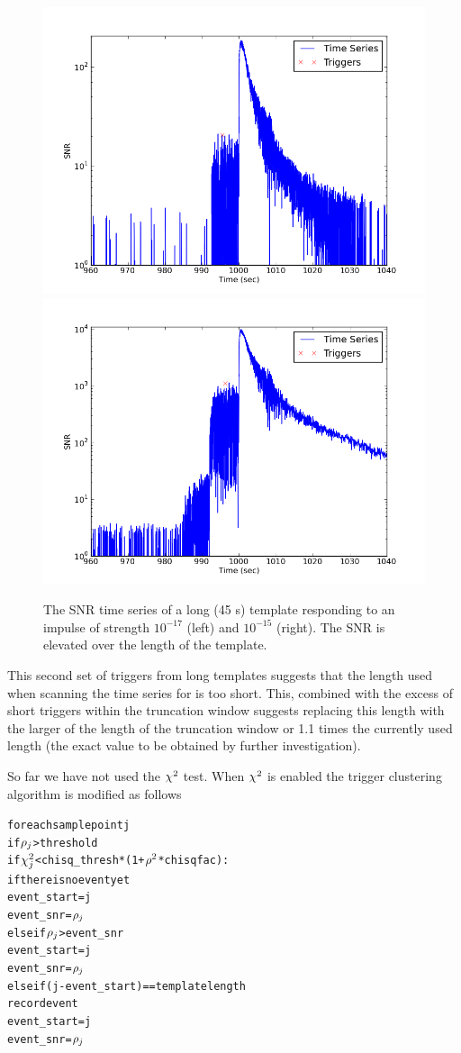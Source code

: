 \begin{figure}
  \includegraphics[width=0.5\linewidth]{figures/detchar/snrs_17_long}
  \includegraphics[width=0.5\linewidth]{figures/detchar/snrs_15_long}
  \caption[SNR time series of a long template and loud impulse] {
  \label{f:long_snr_series}
The SNR time series of a long (45 s) template responding to an
impulse of strength $10^{-17}$ (left) and $10^{-15}$ (right).  The SNR
is elevated over the length of the template. 
}
\end{figure}%

This second set of triggers from long templates suggests that the
length used when scanning the time series for is too short.  This,
combined with the excess of short triggers within the truncation
window suggests replacing this length with the larger of the length of
the truncation window or 1.1 times the currently used length (the
exact value to be obtained by further investigation).

So far we have not used the $\chi^2$ test.  When $\chi^2$ is
enabled the trigger clustering algorithm is modified as follows


\begin{alltt}
for each sample point j
  if \(\rho\sb{j}\) > threshold
    if \(\chisq\sb{j}\) < chisq\_thresh * (1 + \(\rho\sp{2}\) * chisqfac ):
      if there is no event yet
        event\_start = j
        event\_snr   = \(\rho\sb{j}\)
      else if \(\rho\sb{j}\) > event\_snr
        event\_start = j
        event\_snr = \(\rho\sb{j}\)
      else if (j - event\_start) == template length
        record event
        event\_start = j
        event\_snr   = \(\rho\sb{j}\)
\end{alltt}

